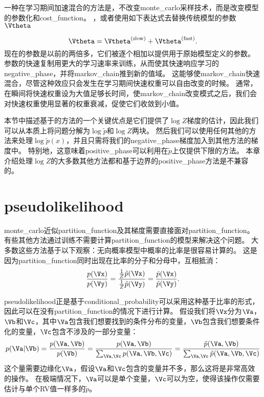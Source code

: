 一种在学习期间加速混合的方法是，不改变\gls{monte_carlo}采样技术，而是改变模型的参数化和\gls{cost_function}。
，或者\citep{TielemanT2009-small}使用如下表达式去替换传统模型的参数$\Vtheta$

\begin{equation}
	\Vtheta = \Vtheta^{\text{(slow)}} + \Vtheta^{\text{(fast)}}.
\end{equation}
现在的参数是以前的两倍多，它们被逐个相加以提供用于原始模型定义的参数。
参数的快速复制用更大的学习速率来训练，从而使其快速响应学习的\gls{negative_phase}，并将\gls{markov_chain}推到新的值域。
这能够使\gls{markov_chain}快速混合，尽管这种效应只会发生在学习期间快速权重可以自由改变的时候。
通常，在瞬间将快速权重设为大值足够长时间，使\gls{markov_chain}改变模式之后，我们会对快速权重使用显著的权重衰减，促使它们收敛到小值。


本节中描述基于的方法的一个关键优点是它们提供了$\log Z$梯度的估计，因此我们可以从本质上将问题分解为$\log \tilde{p}$和$\log Z$两块。
然后我们可以使用任何其他的方法来处理$\log \tilde{p}(x)$，并且只需将我们的\gls{negative_phase}梯度加入到其他方法的梯度中。
特别地，这意味着\gls{positive_phase}可以利用在$\tilde{p}$上仅提供下限的方法。
本章介绍处理$\log Z$的大多数其他方法都和基于边界的\gls{positive_phase}方法是不兼容的。


\section{\gls{pseudolikelihood}}
\label{sec:pseudolikelihood}
\gls{monte_carlo}近似\gls{partition_function}及其梯度需要直接面对\gls{partition_function}。
有些其他方法通过训练不需要计算\gls{partition_function}的模型来解决这个问题。
大多数这些方法基于以下观察：无向概率模型中概率的比率是很容易计算的。
这是因为\gls{partition_function}同时出现在比率的分子和分母中，互相抵消：
\begin{equation}
	\frac{p(\Vx)}{ p(\Vy) } = \frac{ \frac{1}{Z} \tilde{p}(\Vx) }{ \frac{1}{Z} \tilde{p}(\Vy) } =
\frac{ \tilde{p}(\Vx) }{ \tilde{p}(\Vy) }.
\end{equation}


\gls{pseudolikelihood}正是基于\gls{conditional_probability}可以采用这种基于比率的形式，因此可以在没有\gls{partition_function}的情况下进行计算。
假设我们将$\Vx$分为$\Va$，$\Vb$和$\Vc$，其中$\Va$包含我们想要找到的条件分布的变量，$\Vb$包含我们想要条件化的变量，$\Vc$包含不涉及的一部分变量：
\begin{equation}
	p(\Va | \Vb) = \frac{ p(\Va, \Vb) }{ p(\Vb) } = \frac{p(\Va, \Vb)}{ \sum_{\Va, \Vc} p(\Va, \Vb, \Vc) } = \frac{ \tilde{p}(\Va, \Vb) }{ \sum_{\Va, \Vc} \tilde{p}(\Va, \Vb, \Vc) }
\end{equation}
这个量需要边缘化$\Va$，假设$\Va$和$\Vc$包含的变量并不多，那么这将是非常高效的操作。
在极端情况下，$\Va$可以是单个变量，$\Vc$可以为空，使得该操作仅需要估计与单个\gls{RV}值一样多的$\tilde{p}$。


